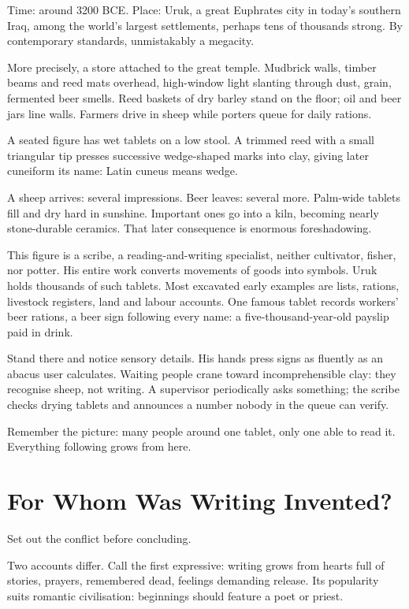 Time: around 3200 BCE. Place: Uruk, a great Euphrates city in today's southern Iraq, among the world's largest settlements, perhaps tens of thousands strong. By contemporary standards, unmistakably a megacity.

More precisely, a store attached to the great temple. Mudbrick walls, timber beams and reed mats overhead, high-window light slanting through dust, grain, fermented beer smells. Reed baskets of dry barley stand on the floor; oil and beer jars line walls. Farmers drive in sheep while porters queue for daily rations.

A seated figure has wet tablets on a low stool. A trimmed reed with a small triangular tip presses successive wedge-shaped marks into clay, giving later cuneiform its name: Latin cuneus means wedge.

A sheep arrives: several impressions. Beer leaves: several more. Palm-wide tablets fill and dry hard in sunshine. Important ones go into a kiln, becoming nearly stone-durable ceramics. That later consequence is enormous foreshadowing.

This figure is a scribe, a reading-and-writing specialist, neither cultivator, fisher, nor potter. His entire work converts movements of goods into symbols. Uruk holds thousands of such tablets. Most excavated early examples are lists, rations, livestock registers, land and labour accounts. One famous tablet records workers' beer rations, a beer sign following every name: a five-thousand-year-old payslip paid in drink.

Stand there and notice sensory details. His hands press signs as fluently as an abacus user calculates. Waiting people crane toward incomprehensible clay: they recognise sheep, not writing. A supervisor periodically asks something; the scribe checks drying tablets and announces a number nobody in the queue can verify.

Remember the picture: many people around one tablet, only one able to read it. Everything following grows from here.

\section{For Whom Was Writing Invented?}
Set out the conflict before concluding.

Two accounts differ. Call the first expressive: writing grows from hearts full of stories, prayers, remembered dead, feelings demanding release. Its popularity suits romantic civilisation: beginnings should feature a poet or priest.

